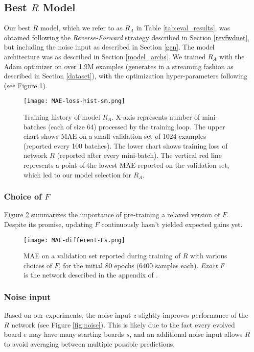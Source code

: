 \documentclass[conference]{IEEEtran}
\begin{document}
\subsection{Best $R$ Model}
Our best $R$ model, which we refer to as $R_A$ in Table \ref{tab:eval_results}, was obtained following the \emph{Reverse-Forward} strategy described in Section \ref{revfwdnet}, but including the noise input as described in Section \ref{gcn}. The model architecture was as described in Section \ref{model_archs}. We trained $R_A$ with the Adam optimizer \cite{kingma2017adam} on over 1.9M examples (generates in a streaming fashion as described in Section \ref{dataset}), with the optimization hyper-parameters following \cite{radford2016unsupervised} (see Figure \ref{fig:mae-loss}).

\begin{figure} %
    \centering
    \texttt{[image: MAE-loss-hist-sm.png]}
    \caption{Training history of model $R_A$. X-axis represents number of mini-batches (each of size 64) processed by the training loop. The upper chart shows MAE on a small validation set of 1024 examples (reported every 100 batches). The lower chart shows training loss of network $R$ (reported after every mini-batch). The vertical red line represents a point of the lowest MAE reported on the validation set, which led to our model selection for $R_A$.}
    \label{fig:mae-loss}
\end{figure}

\subsubsection{Choice of $F$} Figure \ref{fig:fwd_choices} summarizes the importance of pre-training a relaxed version of $F$. Despite its promise, updating $F$ continuously hasn't yielded expected gains yet.

\begin{figure}
    \centering
    \texttt{[image: MAE-different-Fs.png]}
\caption{MAE on a validation set reported during training of $R$ with various choices of $F$, for the initial 80 epochs (6400 samples each). \emph{Exact F} is the network described in the appendix of \cite{springer2020its}.}
        \label{fig:fwd_choices}
\end{figure}

\subsubsection{Noise input}
Based on our experiments, the noise input $z$ slightly improves performance of the $R$ network (see Figure \ref{fig:noise}). This is likely due to the fact every evolved board $e$ may have many starting boards $s$, and an additional noise input allows $R$ to avoid averaging between multiple possible predictions.
\end{document}
